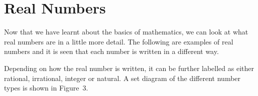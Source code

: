     \section{Real Numbers}
            \nopagebreak
      \label{m38346*id178203}Now that we have learnt about the basics of mathematics, we can look at what
real numbers are in a little more detail. The following are examples of real
numbers and it is seen that each number is written in a different way.\par 
      \label{m38346*uid52}\nopagebreak\noindent{}
      \label{m38346*id178306}Depending on how the real number is written, it can be further labelled as
either rational, irrational, integer or natural. A set diagram of the different
number types is shown in Figure~3.\par 
